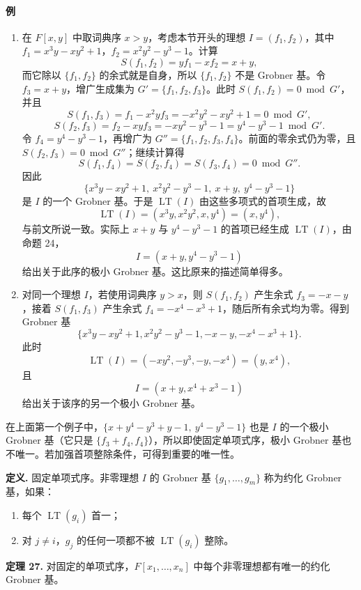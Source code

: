 \paragraph{例}
\begin{enumerate}[label=(\arabic*)]
	\item 在 $F[x,y]$ 中取词典序 $x>y$，考虑本节开头的理想 $I=(f_1,f_2)$，其中 $f_1=x^3y-xy^2+1$，$f_2=x^2y^2-y^3-1$。计算
\[
S(f_1,f_2)=yf_1-xf_2=x+y,
\]
而它除以 $\{f_1,f_2\}$ 的余式就是自身，所以 $\{f_1,f_2\}$ 不是 Grobner 基。令 $f_3=x+y$，增广生成集为 $G'=\{f_1,f_2,f_3\}$。此时 $S(f_1,f_2)=0\bmod G'$，并且
\[
S(f_1,f_3)=f_1-x^2yf_3=-x^2y^2-xy^2+1=0\bmod G',
\]
\[
S(f_2,f_3)=f_2-xyf_3=-xy^2-y^3-1=y^4-y^3-1\bmod G'.
\]
令 $f_4=y^4-y^3-1$，再增广为 $G''=\{f_1,f_2,f_3,f_4\}$。前面的零余式仍为零，且 $S(f_2,f_3)=0\bmod G''$；继续计算得
\[
S(f_1,f_4)=S(f_2,f_4)=S(f_3,f_4)=0\bmod G''.
\]
因此
\[
\{x^3y-xy^2+1,
\ x^2y^2-y^3-1,
\ x+y,
\ y^4-y^3-1\}
\]
是 $I$ 的一个 Grobner 基。于是 $\operatorname{LT}(I)$ 由这些多项式的首项生成，故
\[
\operatorname{LT}(I)=(x^3y,x^2y^2,x,y^4)=(x,y^4),
\]
与前文所说一致。实际上 $x+y$ 与 $y^4-y^3-1$ 的首项已经生成 $\operatorname{LT}(I)$，由命题 24，
\[
I=(x+y,
 y^4-y^3-1)
\]
给出关于此序的极小 Grobner 基。这比原来的描述简单得多。
	\item 对同一个理想 $I$，若使用词典序 $y>x$，则 $S(f_1,f_2)$ 产生余式 $f_3=-x-y$，接着 $S(f_1,f_3)$ 产生余式 $f_4=-x^4-x^3+1$，随后所有余式均为零。得到 Grobner 基
\[
\{x^3y-xy^2+1,
 x^2y^2-y^3-1,
 -x-y,
 -x^4-x^3+1\}.
\]
此时
\[
\operatorname{LT}(I)=(-xy^2,-y^3,-y,-x^4)=(y,x^4),
\]
且
\[
I=(x+y,
 x^4+x^3-1)
\]
给出关于该序的另一个极小 Grobner 基。
\end{enumerate}

在上面第一个例子中，$\{x+y^4-y^3+y-1,\ y^4-y^3-1\}$ 也是 $I$ 的一个极小 Grobner 基（它只是 $\{f_3+f_4,f_4\}$），所以即使固定单项式序，极小 Grobner 基也不唯一。若加强首项整除条件，可得到重要的唯一性。

\noindent\textbf{定义.} 固定单项式序。非零理想 $I$ 的 Grobner 基 $\{g_1,\ldots,g_m\}$ 称为约化 Grobner 基，如果：
\begin{enumerate}[label=(\alph*)]
	\item 每个 $\operatorname{LT}(g_i)$ 首一；
	\item 对 $j\neq i$，$g_j$ 的任何一项都不被 $\operatorname{LT}(g_i)$ 整除。
\end{enumerate}

\noindent\textbf{定理 27.} 对固定的单项式序，$F[x_1,\ldots,x_n]$ 中每个非零理想都有唯一的约化 Grobner 基。

